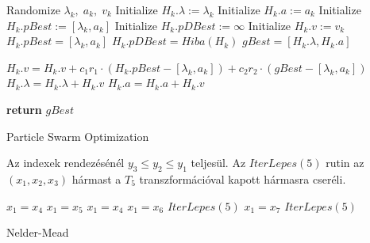 \documentclass[oneside,titlepage,12pt,a4paper]{report}
\begin{document}
\begin{algorithm}[htp] 
\begin{algorithmic}[1]
		\State Randomize $\lambda_k,\; a_k, \; v_k$	 		
		\State Initialize $H_k.\lambda:=\lambda_k$ 
		\State Initialize $H_k.a:=a_k$			
		\State Initialize $H_k.pBest:=[\lambda_k, a_k]$    
		\State Initialize $H_k.pDBest:=\infty$   
		\State Initialize $H_k.v:=v_k$   
	\EndFor
			  
				\State $H_k.pBest=[\lambda_k, a_k]$
				\State $H_k.pDBest= Hiba(H_k)$
			\EndIf
		\EndFor		
		  
				\State $gBest=[H_k.\lambda, H_k.a]$
			\EndIf

							
			\State $H_k.v = H_k.v + c_1 r_1 \cdot (H_k.pBest-[\lambda_k, a_k]) 
						 + c_2 r_2 \cdot (gBest-[\lambda_k, a_k])$ 
			\State $H_k.\lambda = H_k.\lambda + H_k.v$	
			\State $H_k.a = H_k.a + H_k.v$
			
		\EndFor					
	\EndFor
	\State \textbf{return} $gBest$
	\EndFunction
\end{algorithmic}
\caption{Particle Swarm Optimization}
\label{alg:pso}
\end{algorithm}

\fi

Az indexek rendezésénél
$y_3\le y_2\le y_1$ teljesül. Az $IterLepes(5)$ rutin az 
$(x_1,x_2,x_3)$ hármast a $T_5$ transzformációval kapott
hármasra cseréli.
\bigskip

\begin{algorithm}[htb!] 
\begin{algorithmic}[1]
		\State $x_1 = x_4$
			\State $x_1 = x_5$
		\Else
			\State $x_1 = x_4$
		\EndIf
				\State $x_1 = x_6$
			\Else
				\State $IterLepes(5)$
			\EndIf
				\State $x_1 = x_7$
			\Else
				\State $IterLepes(5)$
			\EndIf
		\EndIf
	\EndIf
	\EndFunction
\end{algorithmic}
\caption{Nelder-Mead}
\label{alg:NM}
\end{algorithm}
\end{document}

